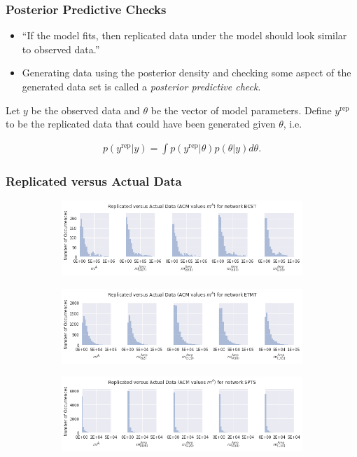 \documentclass{beamer}
\begin{document}
\begin{frame}
\frametitle{Posterior Predictive Checks}
\begin{itemize}
  \item ``If the model fits, then replicated data under the model should look similar
  to observed data.''
  \pause
  \item Generating data using the posterior density and checking some aspect of the generated data set is called a
    \emph{posterior predictive check}.
\end{itemize}
\pause
Let $y$ be the observed data and $\theta$ be the vector of model parameters. Define $y^{\text{rep}}$ to be the replicated data
that could have been generated given $\theta$, i.e.\

\begin{align}\label{form:yrep}
    p(y^{\text{rep}} | y) = \int p(y^{\text{rep}}|\theta)p(\theta | y) d\theta.
\end{align}
\end{frame}

\begin{frame}
\frametitle{Replicated versus Actual Data}
\begin{figure}
  \begin{subfigure}{.75\textwidth}
    \centering
    \includegraphics[scale=0.35]{BCST_m_rep}
  \end{subfigure}
  \begin{subfigure}{.75\textwidth}
    \centering
    \includegraphics[scale=0.35]{ETMT_m_rep}
  \end{subfigure}
  \begin{subfigure}{.75\textwidth}
    \centering
    \includegraphics[scale=0.35]{SPTS_m_rep}
  \end{subfigure}
\end{figure}
\end{frame}
\end{document}
